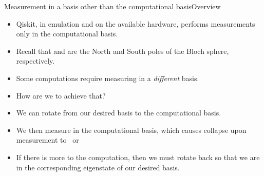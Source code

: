 
\begin{frame}{Measurement in a basis other than the computational basis}{Overview}

\begin{itemize}[<+->]
    \item Qiskit, in emulation and on the available hardware, performs measurements only in the computational basis.
    \item Recall that \QZero{} and \QOne{} are the North and South poles of the Bloch sphere, respectively.
    \item Some computations require measuring in a \emph{different} basis.
    \item How are we to achieve that?
    \item We can rotate from our desired basis to the computational basis.
    \item We then measure in the computational basis, which causes collapse upon measurement to~\QZero{} or~\QOne{}
    \item If there is more to the computation, then we must rotate back so that we are in the corresponding eigenstate of our desired basis.
\end{itemize}
    
\end{frame}

